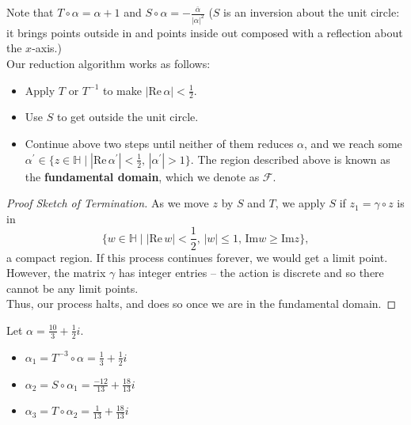 \documentclass[11pt]{article}
\begin{document}
Note that $T \circ \alpha = \alpha + 1$ and $S \circ \alpha = -\frac{\overline{\alpha} }{|\alpha|^2}$ 
($S$ is an inversion about the unit circle: it brings points outside in and points inside out composed with a reflection about the $x$-axis.) \\

Our reduction algorithm works as follows:
\begin{itemize}
    \item Apply $T$ or $T^{-1}$ to make $|\mathrm{Re} \, \alpha| < \frac{1}{2}$.
    \item Use $S$ to get outside the unit circle.
    \item Continue above two steps until neither of them reduces $\alpha$, and we reach some 
    $\alpha^{\prime} \in \{ z \in \mathbb{H} \mid |\mathrm{Re} \, \alpha^{\prime} | < \frac{1}{2}, \, |\alpha^{\prime}| > 1 \}$.
    The region described above is known as the \textbf{fundamental domain}, which we denote as $\mathcal{F}$. 
\end{itemize}

\begin{proof}[Proof Sketch of Termination]
As we move $z$ by $S$ and $T$, we apply $S$ if $z_1 = \gamma \circ z$ is in
\[
    \{ w \in \mathbb{H} \mid |\mathrm{Re} \, w | < \frac{1}{2}, \, |w| \leq 1, \, \mathrm{Im} w \geq  \mathrm{Im} z \}, 
\]
a compact region. If this process continues forever, we would get a limit point. However, the matrix $\gamma$ has integer entries -- the action is discrete
and so there cannot be any limit points. \\

Thus, our process halts, and does so once we are in the fundamental domain.
\end{proof}
\begin{eg}
Let $\alpha = \frac{10}{3} + \frac{1}{2}i$.
\begin{itemize}
    \item $\alpha_1 = T^{-3} \circ \alpha = \frac{1}{3} + \frac{1}{2}i$ 
    \item $\alpha_2 = S \circ \alpha_1 = \frac{-12}{13} + \frac{18}{13}i$
    \item $\alpha_3 = T \circ \alpha_2 = \frac{1}{13} + \frac{18}{13}i$
\end{itemize}
\end{eg}
\end{document}
